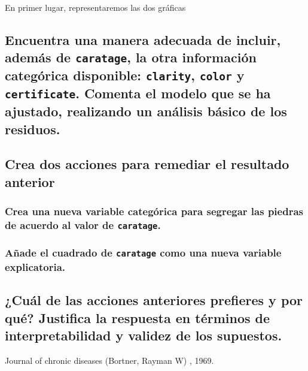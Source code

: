\documentclass[a4paper, 9pt]{article}
\begin{document}
En primer lugar, representaremos las dos gráficas

\subsection{Encuentra una manera adecuada de incluir, además de \texttt{caratage}, la otra información categórica disponible: \texttt{clarity}, \texttt{color} y \texttt{certificate}. Comenta el modelo que se ha ajustado, realizando un análisis básico de los residuos.}
\label{subsec:question-2}


\subsection{Crea dos acciones para remediar el resultado anterior}
\label{subsec:question-3}

\subsubsection{Crea una nueva variable categórica para segregar las piedras de acuerdo al valor de \texttt{caratage}.}

\subsubsection{Añade el cuadrado de \texttt{caratage} como una nueva variable explicatoria.}



\subsection{¿Cuál de las acciones anteriores prefieres y por qué? Justifica la respuesta en términos de interpretabilidad y validez de los supuestos.}
\label{subsec:question-4}



\begin{thebibliography}{9}
    Journal of chronic diseases (Bortner, Rayman W)
    , 1969.

\end{thebibliography}
\end{document}
